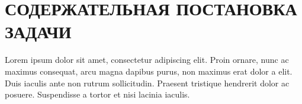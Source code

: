 \newpage
\section{СОДЕРЖАТЕЛЬНАЯ ПОСТАНОВКА ЗАДАЧИ}

Lorem ipsum dolor sit amet, consectetur adipiscing elit. Proin ornare, nunc ac maximus consequat, arcu magna dapibus
purus, non maximus erat dolor a elit. Duis iaculis ante non rutrum sollicitudin. Praesent tristique hendrerit dolor ac
posuere. Suspendisse a tortor et nisi lacinia iaculis.
